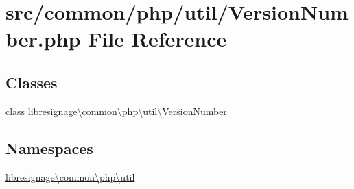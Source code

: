 \hypertarget{VersionNumber_8php}{}\section{src/common/php/util/\+Version\+Number.php File Reference}
\label{VersionNumber_8php}
\subsection*{Classes}
\begin{DoxyCompactItemize}
\item 
class \hyperlink{classlibresignage_1_1common_1_1php_1_1util_1_1VersionNumber}{libresignage\textbackslash{}common\textbackslash{}php\textbackslash{}util\textbackslash{}\+Version\+Number}
\end{DoxyCompactItemize}
\subsection*{Namespaces}
\begin{DoxyCompactItemize}
\item 
 \hyperlink{namespacelibresignage_1_1common_1_1php_1_1util}{libresignage\textbackslash{}common\textbackslash{}php\textbackslash{}util}
\end{DoxyCompactItemize}
